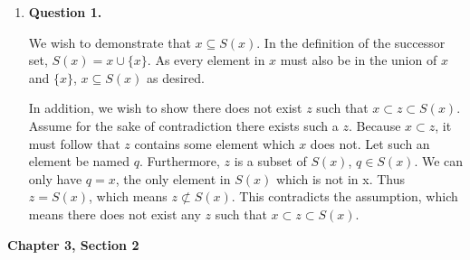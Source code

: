\documentclass{article}
\begin{document}
\begin{enumerate}
	\item \textbf{Question 1.}
	
        We wish to demonstrate that $x \subseteq S(x)$. In the definition of the successor set, $S(x) = x \cup \{x\}$. As every element in $x$ must also be in the union of $x$ and $\{x\}$, $x \subseteq S(x)$ as desired. 
        
        In addition, we wish to show there does not exist $z$ such that $x \subset z \subset S(x)$. Assume for the sake of contradiction there exists such a $z$. Because $x \subset z$, it must follow that $z$ contains some element which $x$ does not. Let such an element be named $q$. Furthermore, $z$ is a subset of $S(x)$, $q \in S(x)$. We can only have $q = x$, the only element in $S(x)$ which is not in x. Thus $z = S(x)$, which means $z \not \subset S(x)$. This contradicts the assumption, which means there does not exist any $z$ such that $x \subset z \subset S(x)$.
\end{enumerate}

\newpage
\medskip
\textbf{Chapter 3, Section 2}
\medskip
\end{document}
